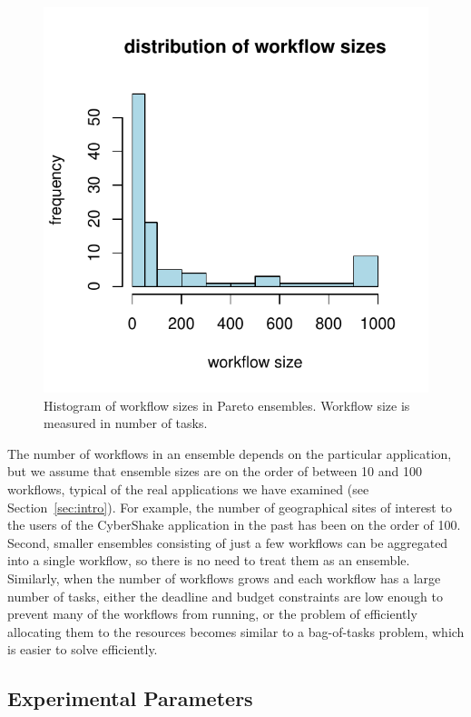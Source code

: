\documentclass[preprint,5p]{elsarticle}
\begin{document}
\begin{figure}[t] 
    \centering
    \includegraphics[width=0.8\columnwidth]{figures/ensemble-pareto}
    \caption[Histogram of workflow sizes in Pareto ensembles]{Histogram of
    workflow sizes in Pareto ensembles. Workflow size is measured in number of
    tasks.}
    \label{fig:ensemble-pareto}
\end{figure}

The number of workflows in an ensemble depends on the particular application,
but we assume that ensemble sizes are on the order of between 10 and 100
workflows, typical of the real applications we have examined (see Section~\ref{sec:intro}). 
For example, the number of
geographical sites of interest to the users of the CyberShake application in
the past has been on the order of 100. 
Second, smaller ensembles consisting of
just a few workflows can be aggregated into a single workflow, so there is no need to
treat them as an ensemble. Similarly, when the number of workflows grows and
each workflow has a large number of tasks, either the deadline and budget
constraints are low enough to prevent many of the workflows from running, or the
problem of efficiently allocating them to the resources becomes similar to a
bag-of-tasks problem, which is easier to solve efficiently.



\subsection{Experimental Parameters}
\label{sec:exp-parameters}
\end{document}
